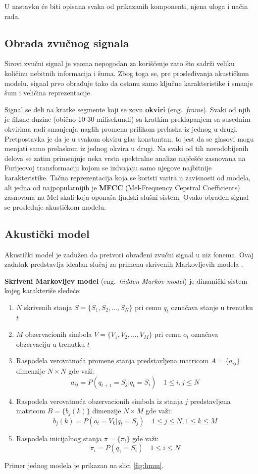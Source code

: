 \documentclass[a4paper]{article}
\begin{document}
U nastavku će biti opisana svaka od prikazanih komponenti, njena uloga i način rada.

\subsection{Obrada zvučnog signala}
Sirovi zvučni signal je veoma nepogodan za korišćenje zato što sadrži veliku količinu nebitnih informacija i šuma.
Zbog toga se, pre prosleđivanja akustičkom modelu, signal prvo obrađuje tako da ostanu samo ključne karakteristike i smanje šum i veličina reprezentacije.

Signal se deli na kratke segmente koji se zovu \textbf{okviri} (eng.~{\em frame}).
Svaki od njih je fiksne duzine (obično 10-30 milisekundi) sa kratkim preklapanjem sa susednim okvirima radi smanjenja naglih promena prilikom prelaska iz jednog u drugi.
Pretpostavka je da je u svakom okviru glas konstantan, to jest da se glasovi mogu menjati samo prelaskom iz jednog okvira u drugi.
Na svaki od tih novodobijenih delova se zatim primenjuje neka vrsta spektralne analize najčešće zasnovana na Furijeovoj transformaciji kojom se izdvajaju samo njegove najbitnije karakteristike.
Tačna reprezentacija koja se koristi varira u zavisnosti od modela, ali jedna od najpopularnijih je \textbf{MFCC} (Mel-Frequency Cepstral Coefficients) \cite{dave2013feature} zasnovana na Mel skali koja oponaša ljudski slušni sistem.
Ovako obrađen signal se prosleđuje akustičkom modelu.

\subsection{Akustički model}
Akustički model je zadužen da pretvori obrađeni zvučni signal u niz fonema. 
Ovaj zadatak predstavlja idealan slučaj za primenu skrivenih Markovljevih modela \cite{rabiner1989hmm}.

\textbf{Skriveni Markovljev model} (eng.~{\em hidden Markov model}) je dinamički sistem kojeg karakteriše sledeće:
\begin{enumerate}
  \item $N$ skrivenih stanja $S = \{S_1, S_2, \dots, S_N\}$ pri cemu $q_t$ označava stanje u trenutku $t$
  \item $M$ obzervacionih simbola $V = \{V_1, V_2, \dots, V_M\}$ pri cemu $o_t$ označava obzervaciju u trenutku $t$
  \item Raspodela verovatnoća promene stanja predstavljena matricom $A=\{a_{ij}\}$ dimenzije $N \times N$ gde važi: $$a_{ij} = P(q_{t+1} = S_j | q_{t} = S_i) \quad 1 \leq i,j \leq N$$
  \item Raspodela verovatnoća obzervacionih simbola iz stanja $j$ predstavljena matricom $B=\{b_j(k)\}$ dimenzije $N \times M$ gde važi: $$b_j(k) = P(o_t = V_k | q_t = S_j) \quad 1 \leq j \leq N, 1 \leq k \leq M$$
  \item Raspodela inicijalnog stanja $\pi=\{\pi_i\}$ gde važi: $$\pi_i = P(q_1 = S_i) \quad 1 \leq i \leq N$$
\end{enumerate}
Primer jednog modela je prikazan na slici \ref{fig:hmm}.
\end{document}
